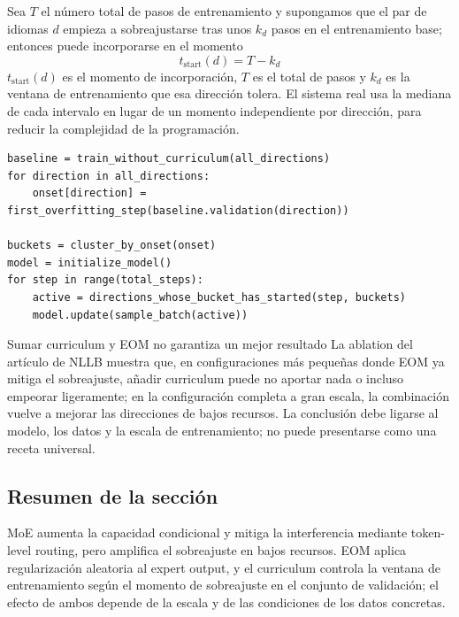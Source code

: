 Sea $T$ el número total de pasos de entrenamiento y supongamos que el par de idiomas $d$ empieza a sobreajustarse tras unos $k_d$ pasos en el entrenamiento base; entonces puede incorporarse en el momento
\[
t_{\text{start}}(d)=T-k_d
\]
$t_{\text{start}}(d)$ es el momento de incorporación, $T$ es el total de pasos y $k_d$ es la ventana de entrenamiento que esa dirección tolera. El sistema real usa la mediana de cada intervalo en lugar de un momento independiente por dirección, para reducir la complejidad de la programación.

\begin{lstlisting}[caption={Phased curriculum basado en el momento de sobreajuste en el conjunto de validación}]
baseline = train_without_curriculum(all_directions)
for direction in all_directions:
    onset[direction] = first_overfitting_step(baseline.validation(direction))

buckets = cluster_by_onset(onset)
model = initialize_model()
for step in range(total_steps):
    active = directions_whose_bucket_has_started(step, buckets)
    model.update(sample_batch(active))
\end{lstlisting}

\begin{warningbox}{Sumar curriculum y EOM no garantiza un mejor resultado}
La ablation del artículo de NLLB muestra que, en configuraciones más pequeñas donde EOM ya mitiga el sobreajuste, añadir curriculum puede no aportar nada o incluso empeorar ligeramente; en la configuración completa a gran escala, la combinación vuelve a mejorar las direcciones de bajos recursos. La conclusión debe ligarse al modelo, los datos y la escala de entrenamiento; no puede presentarse como una receta universal.
\end{warningbox}

\subsection{Resumen de la sección}

MoE aumenta la capacidad condicional y mitiga la interferencia mediante token-level routing, pero amplifica el sobreajuste en bajos recursos. EOM aplica regularización aleatoria al expert output, y el curriculum controla la ventana de entrenamiento según el momento de sobreajuste en el conjunto de validación; el efecto de ambos depende de la escala y de las condiciones de los datos concretas.
